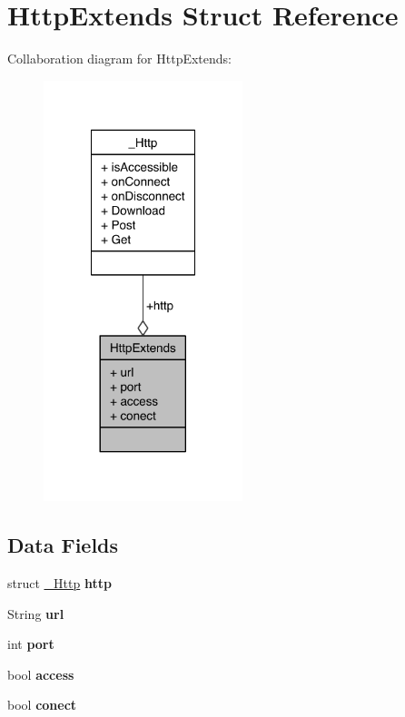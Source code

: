 \hypertarget{structHttpExtends}{\section{Http\-Extends Struct Reference}
\label{structHttpExtends}
}


Collaboration diagram for Http\-Extends\-:\nopagebreak
\begin{figure}[H]
\begin{center}
\leavevmode
\includegraphics[width=164pt]{d8/d42/structHttpExtends__coll__graph}
\end{center}
\end{figure}
\subsection*{Data Fields}
\begin{DoxyCompactItemize}
\item 
\hypertarget{structHttpExtends_aac2793927d10867bce5b93fe1116b97b}{struct \hyperlink{struct__Http}{\-\_\-\-Http} {\bfseries http}}\label{structHttpExtends_aac2793927d10867bce5b93fe1116b97b}

\item 
\hypertarget{structHttpExtends_a983d3a00cb7e2cdac046d6ef1ce9f8f2}{String {\bfseries url}}\label{structHttpExtends_a983d3a00cb7e2cdac046d6ef1ce9f8f2}

\item 
\hypertarget{structHttpExtends_a63c89c04d1feae07ca35558055155ffb}{int {\bfseries port}}\label{structHttpExtends_a63c89c04d1feae07ca35558055155ffb}

\item 
\hypertarget{structHttpExtends_ab4e2372937bb1eec89f2a954a4db6604}{bool {\bfseries access}}\label{structHttpExtends_ab4e2372937bb1eec89f2a954a4db6604}

\item 
\hypertarget{structHttpExtends_a506634736b4585cbeac7cbdefec1e540}{bool {\bfseries conect}}\label{structHttpExtends_a506634736b4585cbeac7cbdefec1e540}

\end{DoxyCompactItemize}


